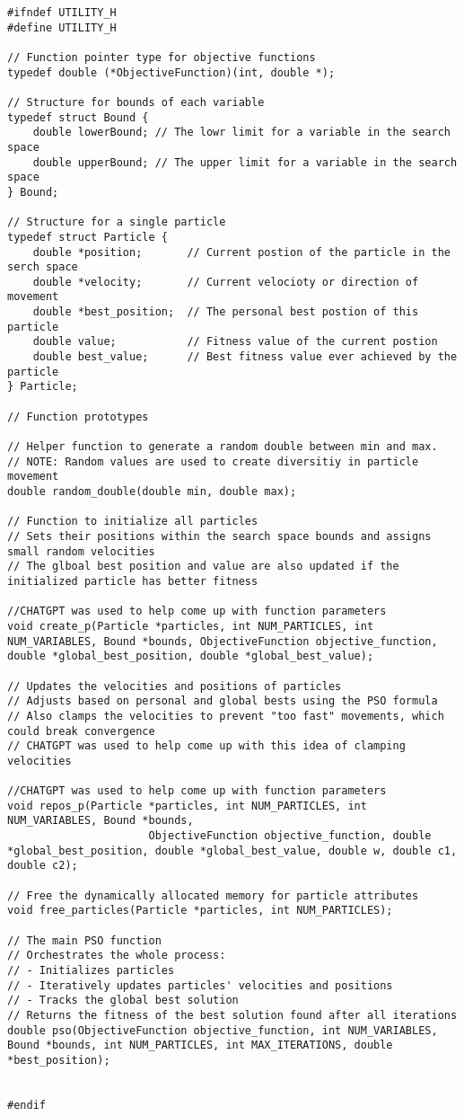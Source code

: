 \documentclass[12pt]{article}
\begin{document}
	\begin{lstlisting}[basicstyle=\small]
#ifndef UTILITY_H
#define UTILITY_H

// Function pointer type for objective functions
typedef double (*ObjectiveFunction)(int, double *);

// Structure for bounds of each variable
typedef struct Bound {
    double lowerBound; // The lowr limit for a variable in the search space
    double upperBound; // The upper limit for a variable in the search space
} Bound;

// Structure for a single particle
typedef struct Particle {
    double *position;       // Current postion of the particle in the serch space
    double *velocity;       // Current velocioty or direction of movement
    double *best_position;  // The personal best postion of this particle
    double value;           // Fitness value of the current postion
    double best_value;      // Best fitness value ever achieved by the particle
} Particle;

// Function prototypes

// Helper function to generate a random double between min and max.
// NOTE: Random values are used to create diversitiy in particle movement
double random_double(double min, double max);

// Function to initialize all particles
// Sets their positions within the search space bounds and assigns small random velocities
// The glboal best position and value are also updated if the initialized particle has better fitness

//CHATGPT was used to help come up with function parameters
void create_p(Particle *particles, int NUM_PARTICLES, int NUM_VARIABLES, Bound *bounds, ObjectiveFunction objective_function, double *global_best_position, double *global_best_value);

// Updates the velocities and positions of particles
// Adjusts based on personal and global bests using the PSO formula
// Also clamps the velocities to prevent "too fast" movements, which could break convergence
// CHATGPT was used to help come up with this idea of clamping velocities

//CHATGPT was used to help come up with function parameters
void repos_p(Particle *particles, int NUM_PARTICLES, int NUM_VARIABLES, Bound *bounds,
                      ObjectiveFunction objective_function, double *global_best_position, double *global_best_value, double w, double c1, double c2);

// Free the dynamically allocated memory for particle attributes
void free_particles(Particle *particles, int NUM_PARTICLES);

// The main PSO function
// Orchestrates the whole process:
// - Initializes particles
// - Iteratively updates particles' velocities and positions
// - Tracks the global best solution
// Returns the fitness of the best solution found after all iterations
double pso(ObjectiveFunction objective_function, int NUM_VARIABLES, Bound *bounds, int NUM_PARTICLES, int MAX_ITERATIONS, double *best_position);


#endif 

	\end{lstlisting}
\end{document}
